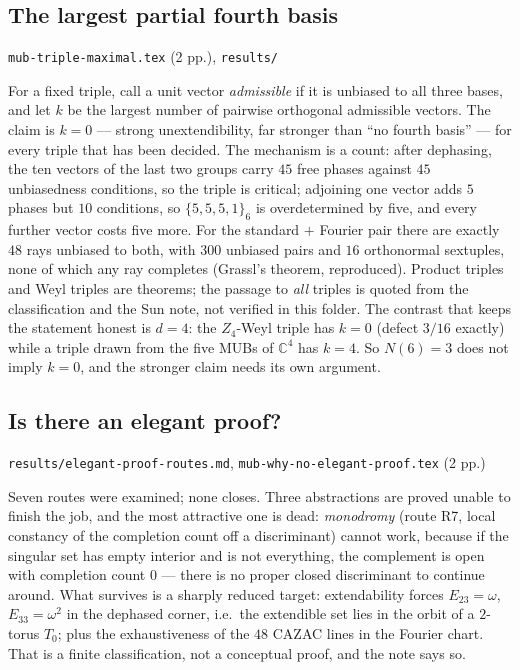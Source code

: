 \documentclass[10pt]{article}
\theoremstyle{definition}
\newcommand{\C}{\mathbb{C}}
\newcommand{\file}[1]{\texttt{\small #1}}
\begin{document}
\subsection{The largest partial fourth basis}\label{sec:fourth}
\file{mub-\allowbreak{}triple-\allowbreak{}maximal.tex} (2 pp.), \file{results/\allowbreak{}}

For a fixed triple, call a unit vector \emph{admissible} if it is unbiased to all three bases, and let
$k$ be the largest number of pairwise orthogonal admissible vectors. The claim is $k=0$ --- strong
unextendibility, far stronger than ``no fourth basis'' --- for every triple that has been decided.
The mechanism is a count: after dephasing, the ten vectors of the last two groups carry $45$ free
phases against $45$ unbiasedness conditions, so the triple is critical; adjoining one vector adds $5$
phases but $10$ conditions, so $\{5,5,5,1\}_6$ is overdetermined by five, and every further vector
costs five more. For the standard $+$ Fourier pair there are exactly $48$ rays unbiased to both, with
$300$ unbiased pairs and $16$ orthonormal sextuples, none of which any ray completes (Grassl's theorem,
reproduced). Product triples and Weyl triples are theorems; the passage to \emph{all} triples is
quoted from the classification and the Sun note, not verified in this folder. The contrast that keeps
the statement honest is $d=4$: the $Z_4$-Weyl triple has $k=0$ (defect $3/16$ exactly) while a triple
drawn from the five MUBs of $\C^4$ has $k=4$. So $N(6)=3$ does not imply $k=0$, and the stronger claim
needs its own argument.

\subsection{Is there an elegant proof?}\label{sec:elegant}
\file{results/\allowbreak{}elegant-\allowbreak{}proof-\allowbreak{}routes.md}, \file{mub-\allowbreak{}why-\allowbreak{}no-\allowbreak{}elegant-\allowbreak{}proof.tex} (2 pp.)

Seven routes were examined; none closes. Three abstractions are proved unable to finish the job, and
the most attractive one is dead: \emph{monodromy} (route R7, local constancy of the completion count
off a discriminant) cannot work, because if the singular set has empty interior and is not everything,
the complement is open with completion count $0$ --- there is no proper closed discriminant to
continue around. What survives is a sharply reduced target: extendability forces $E_{23}=\omega$,
$E_{33}=\omega^2$ in the dephased corner, i.e.\ the extendible set lies in the orbit of a $2$-torus
$T_0$; plus the exhaustiveness of the $48$ CAZAC lines in the Fourier chart. That is a finite
classification, not a conceptual proof, and the note says so.
\end{document}
